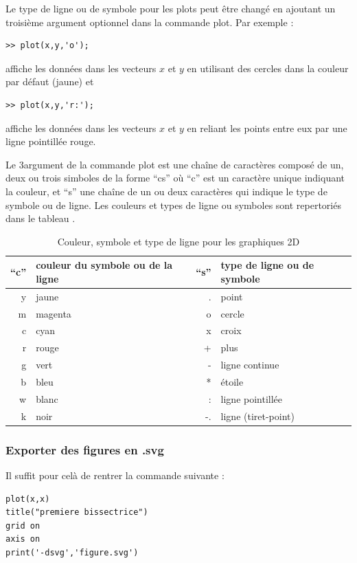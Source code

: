 \documentclass[a4paper,twoside]{article}
\begin{document}
Le type de ligne ou de symbole pour les plots peut être changé en ajoutant un troisième argument optionnel dans la commande plot. Par exemple :
\begin{verbatim}
>> plot(x,y,'o');
\end{verbatim}
affiche les données dans les vecteurs $x$ et $y$ en utilisant des cercles dans la couleur par défaut (jaune) et
\begin{verbatim}
>> plot(x,y,'r:');
\end{verbatim}
affiche les données dans les vecteurs $x$ et $y$ en reliant les points entre eux par une ligne pointillée rouge.

Le 3\ieme argument de la commande plot est une chaîne de caractères composé de un, deux ou trois simboles de la forme ``cs'' où ``c'' est un caractère unique indiquant la couleur, et ``s'' une chaîne de un ou deux caractères qui indique le type de symbole ou de ligne. Les couleurs et types de ligne ou symboles sont repertoriés dans le tableau .

\begin{table}[htb]
\centering
\begin{tabular}{rp{4cm}||rp{4cm}}
``c'' & couleur du symbole ou de la ligne & ``s'' & type de ligne ou de symbole\\\hline
y & jaune & . & point\\
m & magenta & o & cercle\\
c & cyan & x & croix\\
r & rouge & + & plus\\
g & vert & - & ligne continue\\
b & bleu & * & étoile\\
w & blanc & : & ligne pointillée\\
k & noir & -. & ligne (tiret-point)
\end{tabular}
\caption{Couleur, symbole et type de ligne pour les graphiques 2D}\label{tab:matlab_symbole}
\end{table}


\subsubsection{Exporter des figures en .svg}
Il suffit pour celà de rentrer la commande suivante :
\begin{verbatim}
plot(x,x)
title("premiere bissectrice")
grid on
axis on
print('-dsvg','figure.svg')
\end{verbatim}
\end{document}
